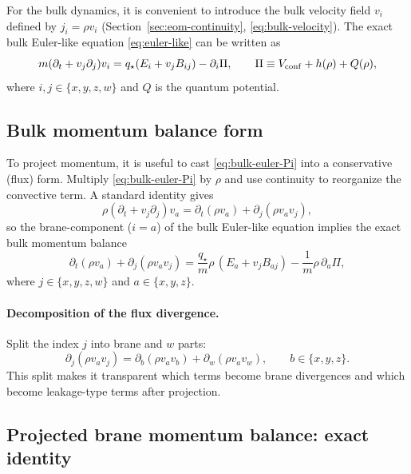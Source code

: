 \documentclass[11pt]{article}
\newcommand{\qstar}{q_\star}
\begin{document}
For the bulk dynamics, it is convenient to introduce the bulk velocity field $v_i$ defined by $j_i=\rho v_i$ (Section~\ref{sec:eom-continuity}, \eqref{eq:bulk-velocity}). The exact bulk Euler-like equation \eqref{eq:euler-like} can be written as
\begin{equation}
m(\partial_t+v_j\partial_j)v_i
=
\qstar(E_i+v_j B_{ij})
-\partial_i\Pi,
\qquad
\Pi \equiv V_{\rm conf}+h(\rho)+Q(\rho),
\label{eq:bulk-euler-Pi}
\end{equation}
where $i,j\in\{x,y,z,w\}$ and $Q$ is the quantum potential.

\subsection{Bulk momentum balance form}
\label{app:momentum-bulkbalance}

To project momentum, it is useful to cast \eqref{eq:bulk-euler-Pi} into a conservative (flux) form. Multiply \eqref{eq:bulk-euler-Pi} by $\rho$ and use continuity to reorganize the convective term. A standard identity gives
\begin{equation}
\rho(\partial_t+v_j\partial_j)v_a
=
\partial_t(\rho v_a) + \partial_j(\rho v_a v_j),
\end{equation}
so the brane-component ($i=a$) of the bulk Euler-like equation implies the exact bulk momentum balance
\begin{equation}
\boxed{
\partial_t(\rho v_a) + \partial_j(\rho v_a v_j)
=
\frac{\qstar}{m}\rho\,(E_a+v_j B_{aj})
-\frac{1}{m}\rho\,\partial_a\Pi,
}
\label{eq:bulk-momentum-balance}
\end{equation}
where $j\in\{x,y,z,w\}$ and $a\in\{x,y,z\}$.

\paragraph{Decomposition of the flux divergence.}
Split the index $j$ into brane and $w$ parts:
\begin{equation}
\partial_j(\rho v_a v_j)
=
\partial_b(\rho v_a v_b) + \partial_w(\rho v_a v_w),
\qquad b\in\{x,y,z\}.
\label{eq:flux-split}
\end{equation}
This split makes it transparent which terms become brane divergences and which become leakage-type terms after projection.

\subsection{Projected brane momentum balance: exact identity}
\label{app:momentum-projected}
\end{document}
